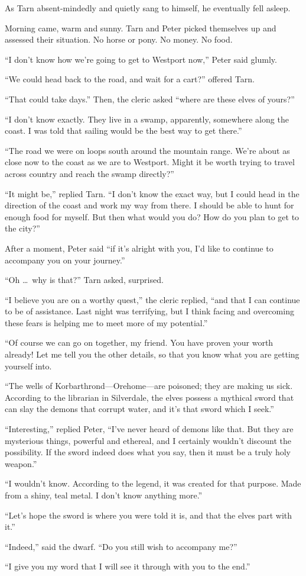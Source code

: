 As Tarn absent-mindedly and quietly sang to himself, he eventually fell asleep.


Morning came, warm and sunny.  Tarn and Peter picked themselves up and assessed their situation.  No horse or pony.  No money.  No food.

``I don't know how we're going to get to Westport now,'' Peter said glumly.

``We could head back to the road, and wait for a cart?'' offered Tarn.

``That could take days.''  Then, the cleric asked ``where are these elves of yours?''

``I don't know exactly.  They live in a swamp, apparently, somewhere along the coast.  I was told that sailing would be the best way to get there.''

``The road we were on loops south around the mountain range.  We're about as close now to the coast as we are to Westport.  Might it be worth trying to travel across country and reach the swamp directly?''

``It might be,'' replied Tarn.  ``I don't know the exact way, but I could head in the direction of the coast and work my way from there.  I should be able to hunt for enough food for myself.  But then what would you do?  How do you plan to get to the city?''

After a moment, Peter said ``if it's alright with you, I'd like to continue to accompany you on your journey.''

``Oh \ldots\ why is that?'' Tarn asked, surprised.

``I believe you are on a worthy quest,'' the cleric replied, ``and that I can continue to be of assistance.  Last night was terrifying, but I think facing and overcoming these fears is helping me to meet more of my potential.''

``Of course we can go on together, my friend.  You have proven your worth already!  Let me tell you the other details, so that you know what you are getting yourself into.

``The wells of Korbarthrond---Orehome---are poisoned; they are making us sick.  According to the librarian in Silverdale, the elves possess a mythical sword that can slay the demons that corrupt water, and it's that sword which I seek.''

``Interesting,'' replied Peter, ``I've never heard of demons like that.  But they are mysterious things, powerful and ethereal, and I certainly wouldn't discount the possibility.  If the sword indeed does what you say, then it must be a truly holy weapon.''

``I wouldn't know.  According to the legend, it was created for that purpose.  Made from a shiny, teal metal.  I don't know anything more.''

``Let's hope the sword is where you were told it is, and that the elves part with it.''

``Indeed,'' said the dwarf.  ``Do you still wish to accompany me?''

``I give you my word that I will see it through with you to the end.''